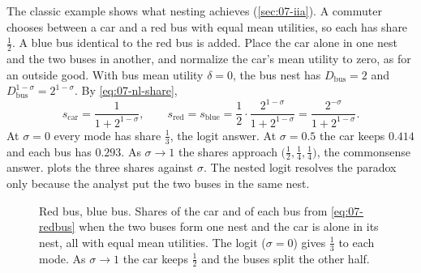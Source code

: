 The classic example shows what nesting achieves (\cref{sec:07-iia}). A commuter chooses between a car and a red
bus with equal mean utilities, so each has share $\frac{1}{2}$. A blue bus identical to the red bus is added.
Place the car alone in one nest and the two buses in another, and normalize the car's mean utility to zero, as for
an outside good. With bus mean utility $\delta = 0$, the bus nest has $D_{\text{bus}} = 2$ and
$D_{\text{bus}}^{1-\sigma} = 2^{1-\sigma}$. By \eqref{eq:07-nl-share},
\begin{equation}\label{eq:07-redbus}
s_{\text{car}} = \frac{1}{1 + 2^{1-\sigma}}, \qquad
s_{\text{red}} = s_{\text{blue}} = \frac{1}{2}\cdot\frac{2^{1-\sigma}}{1 + 2^{1-\sigma}} = \frac{2^{-\sigma}}{1 + 2^{1-\sigma}} .
\end{equation}
At $\sigma = 0$ every mode has share $\frac{1}{3}$, the logit answer. At $\sigma = 0.5$ the car keeps $0.414$ and
each bus has $0.293$. As $\sigma \to 1$ the shares approach $\big(\frac{1}{2}, \frac{1}{4}, \frac{1}{4}\big)$,
the commonsense answer.  plots the three shares against $\sigma$. The nested logit resolves the
paradox only because the analyst put the two buses in the same nest.

\begin{figure}[htbp]
\centering
{}
\caption{Red bus, blue bus. Shares of the car and of each bus from \eqref{eq:07-redbus} when the two buses form one
nest and the car is alone in its nest, all with equal mean utilities. The logit ($\sigma = 0$) gives
$\frac{1}{3}$ to each mode. As $\sigma \to 1$ the car keeps $\frac{1}{2}$ and the buses split the other half.}
\label{fig:07-redbus}
\end{figure}

